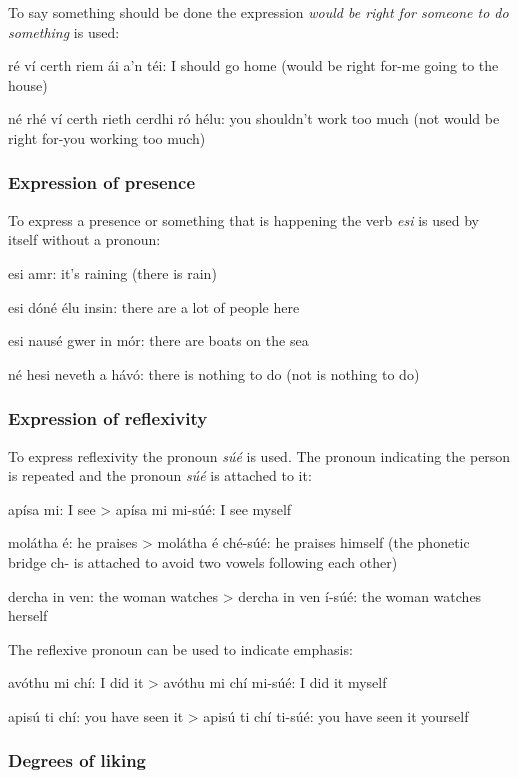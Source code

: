 To say something should be done the expression \textit{would be right for someone to do something} is used:

r\'{e} v\'{i} certh riem \'{a}i a'n t\'{e}i: I should go home (would be right for-me going to the house)

n\'{e} rh\'{e} v\'{i} certh rieth cerdhi r\'{o} h\'{e}lu: you shouldn't work too much (not would be right for-you working too much)

\subsubsection{Expression of presence}

To express a presence or something that is happening the verb \textit{esi} is used by itself without a pronoun:

esi amr: it's raining (there is rain)

esi d\'{o}n\'{e} \'{e}lu insin: there are a lot of people here

esi naus\'{e} gwer in m\'{o}r: there are boats on the sea

n\'{e} hesi neveth a h\'{a}v\'{o}: there is nothing to do (not is nothing to do)
 
\subsubsection{Expression of reflexivity}

To express reflexivity the pronoun \textit{s\'{u}\'{e}} is used. The pronoun indicating the person is repeated and the pronoun \textit{s\'{u}\'{e}} is attached to it:

ap\'{i}sa mi: I see
> ap\'{i}sa mi mi-s\'{u}\'{e}: I see myself

mol\'{a}tha \'{e}: he praises
> mol\'{a}tha \'{e} ch\'{e}-s\'{u}\'{e}: he praises himself (the phonetic bridge ch- is attached to avoid two vowels following each other)

dercha in ven: the woman watches
> dercha in ven \'{i}-s\'{u}\'{e}: the woman watches herself

The reflexive pronoun can be used to indicate emphasis:

av\'{o}thu mi ch\'{i}: I did it
> av\'{o}thu mi ch\'{i} mi-s\'{u}\'{e}: I did it myself

apis\'{u} ti ch\'{i}: you have seen it
> apis\'{u} ti ch\'{i} ti-s\'{u}\'{e}: you have seen it yourself

\subsubsection{Degrees of liking}

